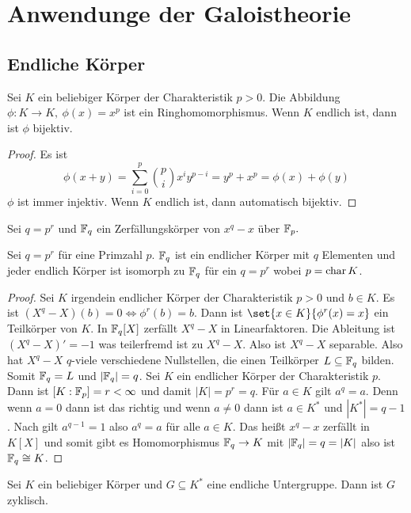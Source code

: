 \chapter{Anwendunge der Galoistheorie}
\section{Endliche Körper}
\begin{Lemma}
	Sei \(K\) ein beliebiger Körper der Charakteristik \(p>0\). Die Abbildung 
	\(\phi\colon K\to K,\ \phi(x)=x^p\) ist ein Ringhomomorphismus.
	Wenn \(K\) endlich ist, dann ist
	\(\phi\) bijektiv.
\end{Lemma}
\begin{proof}
	Es ist \[\phi(x+y)=\sum_{i=0}^p\binom{p}{i}x^iy^{p-i}=y^p+x^p=\phi(x)+\phi(y)\]
	\(\phi\) ist immer injektiv. Wenn \(K\) endlich ist, dann automatisch bijektiv.
\end{proof}
\begin{Def}
	Sei \(q=p^r\) und \(\mathbb{F}_q\) ein Zerfällungskörper von \(x^q-x\) über \(\mathbb{F}_p.\)
\end{Def}
\begin{Satz} Sei \(q=p^r\) für eine Primzahl \(p\).
	\(\mathbb{F}_q\) ist ein endlicher Körper mit \(q\) Elementen und jeder endlich Körper ist isomorph zu \(\mathbb{F}_q\) für ein \(q=p^r\) wobei \(p=\operatorname{char} K\).
\end{Satz}
\begin{proof}
	Sei \(K\) irgendein endlicher Körper der Charakteristik \(p>0\) und \(b\in K\). Es ist \((X^q-X)(b)=0\iff \phi^r(b)=b\). Dann ist \(\set{x\in K}{ \phi^r(x)=x}\) ein Teilkörper von \(K\).
	In \(\mathbb{F}_q[X]\) zerfällt \(X^q-X\) in Linearfaktoren. Die Ableitung ist \((X^q-X)'=-1\) was teilerfremd ist zu \(X^q-X\). Also ist \(X^q-X\) separable. Also hat \(X^q-X\) \(q\)-viele verschiedene Nullstellen, die einen Teilkörper \(L\subseteq \mathbb{F}_q\) bilden. Somit \(\mathbb{F}_q=L\) und \(|\mathbb{F}_q|=q\).
	Sei \(K\) ein endlicher Körper der Charakteristik \(p\). Dann ist \([K:\mathbb{F}_p]=r<\infty\) und damit \(|K|=p^r=q\).
	Für \(a\in K\) gilt \(a^q=a\). Denn wenn \(a=0\) dann ist das richtig und wenn \(a\neq 0\) dann ist \(a\in K^*\) und \(|K^*|=q-1\). Nach  gilt \(a^{q-1}=1\) also \(a^q=a\) für alle \(a\in K\). Das heißt \(x^q-x\) zerfällt in \(K[X]\) und somit gibt es Homomorphismus \(\mathbb{F}_q\to K\) mit \(|\mathbb{F}_q|=q=|K|\) also ist \(\mathbb{F}_q\cong K\).
\end{proof}
\begin{Satz}
	Sei \(K\) ein beliebiger Körper und \(G\subseteq K^*\) eine endliche Untergruppe. Dann ist \(G\) zyklisch.
\end{Satz}
